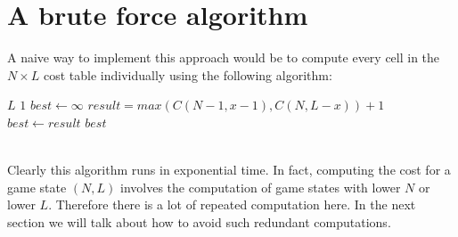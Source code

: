 \documentclass[12pt,a4paper,oneside]{report}
\begin{document}
\section{A brute force algorithm}
A naive way to implement this approach would be to compute every cell in the $N \times L$ cost table individually using the following algorithm:
\begin{algorithm}
\caption{$C(N, L)$}
\begin{algorithmic}[1]
	\RETURN $L$
	\RETURN $1$
\ENDIF
\STATE $best \leftarrow \infty$
	\STATE $result = max(C(N - 1, x - 1), C(N, L - x))+1$
		\STATE $best \leftarrow result$
	\ENDIF
\ENDFOR
\RETURN $best$
\end{algorithmic}
\end{algorithm}
~\\
Clearly this algorithm runs in exponential time. In fact, computing the cost for a game state $(N, L)$ involves the computation of game states with lower $N$ or lower $L$. Therefore there is a lot of repeated computation here. In the next section we will talk about how to avoid such redundant computations.
\end{document}
